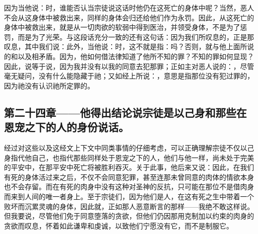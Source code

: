因为当他说：时，谁能否认当宗徒说这话时他仍在这死亡的身体中呢？当然，恶人不会从这身体中被救出来，同样的身体会归还给他们作为永罚。因此，从这死亡的身体中被救出来，就是从一切肉欲的软弱中得到医治，并领受身体，不是为了惩罚，而是为了光荣。与这段话充分一致的还有这句话：因为我们所叹息的，正是那叹息，其中我们说：此外，当他说：时，这不就是指：吗？否则，就与他上面所说的和以及相矛盾。因为，他如何借法律知道了他所不知的罪？不知的罪如何显现？因此，说等于说，因为我并没有以我的同意去犯那罪；正如主对恶人说的：，尽管毫无疑问，没有什么能隐藏于祂；又如经上所说：，意思是指那位没有犯过罪的，因为祂没有认识祂所定罪的。\par


\subsection{第二十四章——他得出结论说宗徒是以己身和那些在恩宠之下的人的身份说话。}

经过对这些以及这经文上下文中同类事情的仔细考虑，可以正确理解宗徒不仅以己身指代他自己，也指代那些同样处于恩宠之下的人，他们与他一样，尚未处于完美的平安中，在那平安中死亡将被胜利吞灭。关于此事，他后来又说：因此，在我们有死的身体活过来之后，不仅不会同意犯罪，甚至连那未曾同意的肉体的情欲本身也不会存留。而在有死的肉身中没有这种对圣神的反抗，只可能在那位不是借肉身而来到人间的唯一者身上。至于宗徒们，因为他们是人，在这有死之生中带着一个败坏而沉累灵魂的身体，因此就，正如那人恶意断言的那样——我绝不敢这样说。但我要说，尽管他们免于同意堕落的贪欲，但他们仍因那用克制加以约束的肉身的贪欲而叹息，怀着如此谦卑和虔诚，以致他们宁愿没有它，而不是制服它。\par


